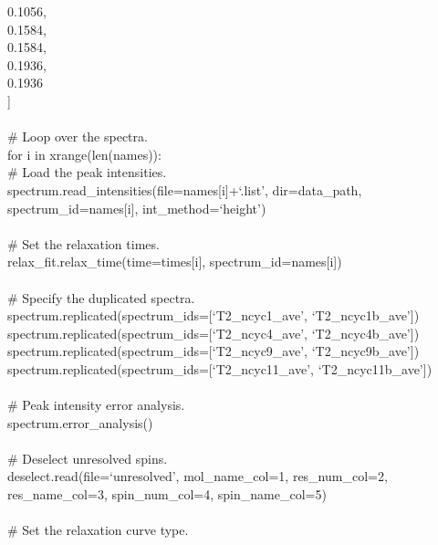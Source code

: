 \begin{exampleenv}
\hspace*{4ex} 0.1056, \\
\hspace*{4ex} 0.1584, \\
\hspace*{4ex} 0.1584, \\
\hspace*{4ex} 0.1936, \\
\hspace*{4ex} 0.1936 \\
] \\
 \\
\# Loop over the spectra. \\
for i in xrange(len(names)): \\
\hspace*{4ex} \# Load the peak intensities. \\
\hspace*{4ex} spectrum.read\_intensities(file=names[i]+`.list', dir=data\_path, spectrum\_id=names[i], int\_method=`height') \\
 \\
\hspace*{4ex} \# Set the relaxation times. \\
\hspace*{4ex} relax\_fit.relax\_time(time=times[i], spectrum\_id=names[i]) \\
 \\
\# Specify the duplicated spectra. \\
spectrum.replicated(spectrum\_ids=[`T2\_ncyc1\_ave', `T2\_ncyc1b\_ave']) \\
spectrum.replicated(spectrum\_ids=[`T2\_ncyc4\_ave', `T2\_ncyc4b\_ave']) \\
spectrum.replicated(spectrum\_ids=[`T2\_ncyc9\_ave', `T2\_ncyc9b\_ave']) \\
spectrum.replicated(spectrum\_ids=[`T2\_ncyc11\_ave', `T2\_ncyc11b\_ave']) \\
 \\
\# Peak intensity error analysis. \\
spectrum.error\_analysis() \\
 \\
\# Deselect unresolved spins. \\
deselect.read(file=`unresolved', mol\_name\_col=1, res\_num\_col=2, res\_name\_col=3, spin\_num\_col=4, spin\_name\_col=5) \\
 \\
\# Set the relaxation curve type. \\

\end{exampleenv}
